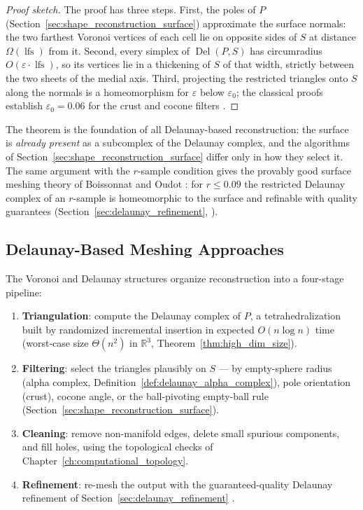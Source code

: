 \begin{proof}[Proof sketch]
  The proof has three steps. First, the poles of $P$
  (Section~\ref{sec:shape_reconstruction_surface}) approximate the surface
  normals: the two farthest Voronoi vertices of each cell lie on opposite sides
  of $S$ at distance $\Omega(\operatorname{lfs})$ from it. Second, every simplex
  of $\operatorname{Del}(P, S)$ has circumradius $O(\varepsilon \cdot
  \operatorname{lfs})$, so its vertices lie in a thickening of $S$ of that
  width, strictly between the two sheets of the medial axis. Third, projecting
  the restricted triangles onto $S$ along the normals is a homeomorphism for
  $\varepsilon$ below $\varepsilon_0$; the classical proofs establish
  $\varepsilon_0 = 0.06$ for the crust and cocone filters
  \cite{amentabern1999,amenta2000}.
\end{proof}

The theorem is the foundation of all Delaunay-based reconstruction: the surface
is \emph{already present} as a subcomplex of the Delaunay complex, and the
algorithms of Section~\ref{sec:shape_reconstruction_surface} differ only in
how they select it. The same argument with the $r$-sample condition gives the
provably good surface meshing theory of Boissonnat and Oudot
\cite{boissonnat2005}: for $r \le 0.09$ the restricted Delaunay complex of an
$r$-sample is homeomorphic to the surface and refinable with quality
guarantees (Section~\ref{sec:delaunay_refinement}, \cite{shewchuk2002}).

\subsection{Delaunay-Based Meshing Approaches}

The Voronoi and Delaunay structures organize reconstruction into a four-stage
pipeline:

\begin{enumerate}
  \item \textbf{Triangulation}: compute the Delaunay complex of $P$, a
    tetrahedralization built by randomized incremental insertion in expected
    $O(n \log n)$ time (worst-case size $\Theta(n^2)$ in $\mathbb{R}^3$,
    Theorem~\ref{thm:high_dim_size}).
  \item \textbf{Filtering}: select the triangles plausibly on $S$ --- by
    empty-sphere radius (alpha complex, Definition~\ref{def:delaunay_alpha_complex}),
    pole orientation (crust), cocone angle, or the ball-pivoting empty-ball rule
    (Section~\ref{sec:shape_reconstruction_surface}).
  \item \textbf{Cleaning}: remove non-manifold edges, delete small spurious
    components, and fill holes, using the topological checks of
    Chapter~\ref{ch:computational_topology}.
  \item \textbf{Refinement}: re-mesh the output with the guaranteed-quality
    Delaunay refinement of Section~\ref{sec:delaunay_refinement} \cite{shewchuk2002}.
\end{enumerate}


